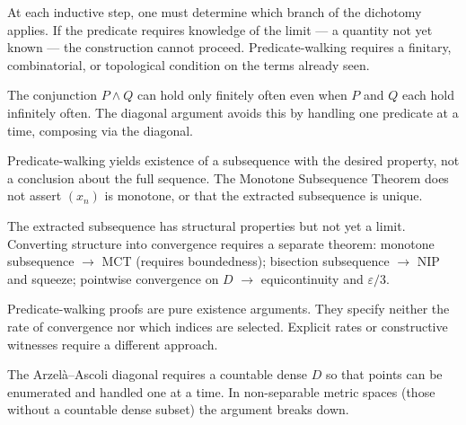 \begin{remark}
At each inductive step, one must determine which branch of the dichotomy
applies. If the predicate requires knowledge of the limit --- a quantity not
yet known --- the construction cannot proceed. Predicate-walking requires a
finitary, combinatorial, or topological condition on the terms already seen.
\end{remark}

\begin{remark}
The conjunction $P\wedge Q$ can hold only finitely often even when $P$ and
$Q$ each hold infinitely often. The diagonal argument avoids this by handling
one predicate at a time, composing via the diagonal.
\end{remark}

\begin{remark}
Predicate-walking yields existence of a subsequence with the desired
property, not a conclusion about the full sequence. The Monotone Subsequence
Theorem does not assert $(x_n)$ is monotone, or that the extracted
subsequence is unique.
\end{remark}

\begin{remark}
The extracted subsequence has structural properties but not yet a limit.
Converting structure into convergence requires a separate theorem:
monotone subsequence $\to$ MCT (requires boundedness);
bisection subsequence $\to$ NIP and squeeze;
pointwise convergence on $D$ $\to$ equicontinuity and $\varepsilon/3$.
\end{remark}

\begin{remark}
Predicate-walking proofs are pure existence arguments. They specify neither
the rate of convergence nor which indices are selected. Explicit rates or
constructive witnesses require a different approach.
\end{remark}

\begin{remark}
The Arzel\`a--Ascoli diagonal requires a countable dense $D$ so that points
can be enumerated and handled one at a time. In non-separable metric spaces
(those without a countable dense subset) the argument breaks down.
\end{remark}

